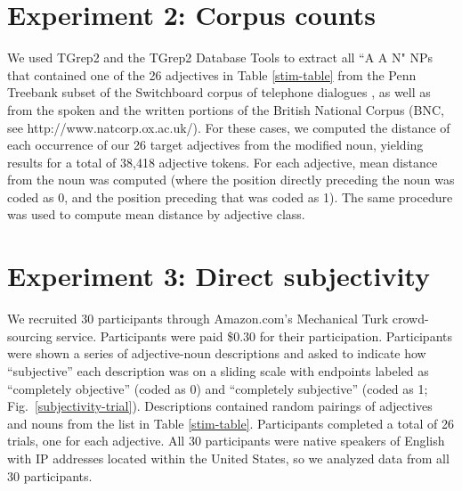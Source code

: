 \documentclass{pnastwo}
\newcommand{\tableref}[1]{Table \ref{#1}}
\newcommand{\figref}[1]{~\ref{#1}}
\begin{document}
\begin{article}
\begin{materials}



\section{Experiment 2: Corpus counts} 
We used TGrep2 \cite{rohde2005} and the TGrep2 Database Tools \cite{degenjaeger-tdt} to extract all ``A A N"  NPs that contained one of the 26 adjectives in Table \ref{stim-table} from the Penn Treebank subset of the Switchboard corpus of telephone dialogues \cite{godfrey1992}, as well as from the spoken and the written portions of the British National Corpus (BNC, see http://www.natcorp.ox.ac.uk/). For these cases, we computed the distance of each occurrence of our 26 target adjectives from the modified noun, yielding results for a total of 38,418 adjective tokens.  For each adjective, mean distance from the noun was computed (where the position directly preceding the noun was coded as 0, and the position preceding that was coded as 1). The same procedure was used to compute mean distance by adjective class.

\section{Experiment 3: Direct subjectivity}
We recruited 30 participants through Amazon.com's Mechanical Turk crowd-sourcing service. Participants were paid \$0.30 for their participation. Participants were shown a series of adjective-noun descriptions and asked to indicate how ``subjective'' each description was on a sliding scale with endpoints labeled as ``completely objective'' (coded as 0) and ``completely subjective'' (coded as 1; Fig.~\ref{subjectivity-trial}). Descriptions contained random pairings of adjectives and nouns from the list in Table \ref{stim-table}. Participants completed a total of 26 trials, one for each adjective. All 30 participants were native speakers of English with IP addresses located within the United States, so we analyzed data from all 30 participants.


\end{materials}
\end{article}
\end{document}
